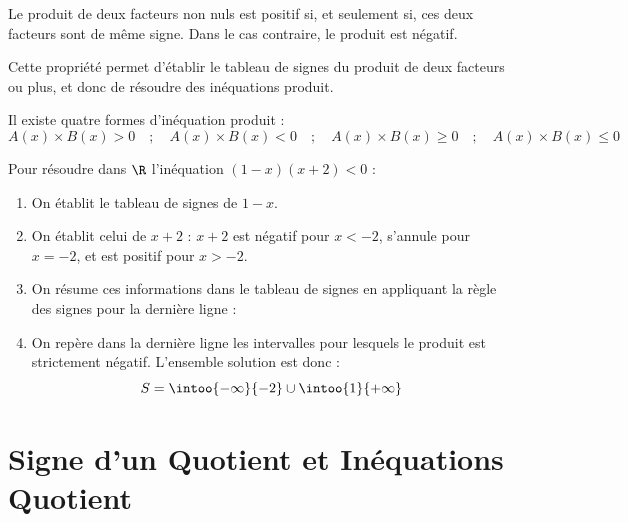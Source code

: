 \begin{propriete}
	Le produit de deux facteurs non nuls est positif si, et seulement si, ces deux facteurs sont de même signe. Dans le cas contraire, le produit est négatif.
\end{propriete}

Cette propriété permet d'établir le tableau de signes du produit de deux facteurs ou plus, et donc de résoudre des inéquations produit.

\begin{remarque}
	Il existe quatre formes d'inéquation produit :
	\[
		A(x) \times B(x) > 0 \quad ; \quad A(x) \times B(x) < 0 \quad ; \quad A(x) \times B(x) \ge 0 \quad ; \quad A(x) \times B(x) \le 0
	\]
\end{remarque}

\begin{exemple}
	Pour résoudre dans $\R$ l'inéquation $(1-x)(x+2) < 0$ :
	\begin{enumerate}
		\item On établit le tableau de signes de $1-x$.
		\item On établit celui de $x+2$ : $x+2$ est négatif pour $x < -2$, s'annule pour $x = -2$, et est positif pour $x > -2$.
		\item On résume ces informations dans le tableau de signes en appliquant la règle des signes pour la dernière ligne :

		      \begin{center}
		      \end{center}

		\item On repère dans la dernière ligne les intervalles pour lesquels le produit est strictement négatif. L'ensemble solution est donc :
		      \[
			      S = \intoo{-\infty}{-2} \cup \intoo{1}{+\infty}
		      \]
	\end{enumerate}
\end{exemple}

\section{Signe d'un Quotient et Inéquations Quotient}

